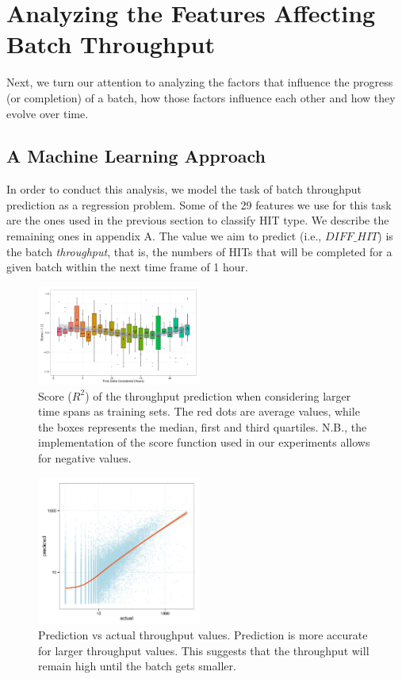 \section{Analyzing the Features Affecting Batch Throughput}
\label{sec:throughput}
Next, we turn our attention to analyzing the factors that influence the  progress (or completion) of a batch, how those factors influence each other and how they evolve over time.

\subsection{A Machine Learning Approach}
In order to conduct this analysis, we model the task of batch throughput prediction as a regression problem.  Some of the  29  features we use for this task are the ones used in the previous section to classify HIT type.  We describe the remaining ones in appendix A. The value  we aim to predict (i.e.,   $DIFF\_HIT$) is the batch \emph{throughput}, that is, the numbers of HITs that   will be completed for a given batch within the next time frame of 1 hour.

\begin{figure}[tb]
	\centering
		\includegraphics[width=0.48\textwidth]{figures/ML_accuracy}
	\caption{Score ($R^2$) of the throughput prediction when considering larger time spans as training sets. The red dots are average values, while the boxes represents the median, first and third quartiles. N.B., the implementation of the score function used in our experiments allows for negative values.}
	\label{fig:accuracy}
\end{figure}

\begin{figure}[tb]
	\centering
		\includegraphics[width=0.48\textwidth]{figures/predictions_3}
	\caption{Prediction vs actual throughput values. Prediction is more accurate for larger throughput values. This suggests that the throughput will remain high until the batch gets smaller.}
	\label{fig:pred}
\end{figure}

